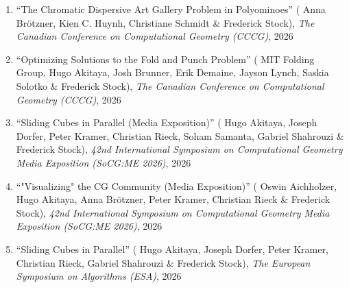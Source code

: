 \documentclass[letterpaper,11pt]{article}
\makeatletter
\newcommand{\publication}[6]{
  \item ``#1'' %
   (\ignorespaces#2), %
     \emph{#3}, %
      #4%


}
\newcommand{\pdficon}{\faFilePdf}
\newcommand{\doilabel}{\texttt{DOI}}
\makeatother
\begin{document}
    \begin{enumerate}
    \setcounter{enumi}{\value{pubnum}}
      
        \publication
          {The Chromatic Dispersive Art Gallery Problem in Polyominoes}
          {
 Anna Brötzner, Kien C. Huynh, Christiane Schmidt \& Frederick Stock}
          {The Canadian Conference on Computational Geometry (CCCG)}
          {2026}
          {%
%
%
%
          }
          {1}
 \vspace{-.5em}  
      
        \publication
          {Optimizing Solutions to the Fold and Punch Problem}
          {
 MIT Folding Group, Hugo Akitaya, Josh Brunner, Erik Demaine, Jayson Lynch, Saskia Solotko \& Frederick Stock}
          {The Canadian Conference on Computational Geometry (CCCG)}
          {2026}
          {%
%
%
%
          }
          {2}
 \vspace{-.5em}  
      
        \publication
          {Sliding Cubes in Parallel (Media Exposition)}
          {
 Hugo Akitaya, Joseph Dorfer, Peter Kramer, Christian Rieck, Soham Samanta, Gabriel Shahrouzi \& Frederick Stock}
          {42nd International Symposium on Computational Geometry Media Exposition (SoCG:ME 2026)}
          {2026}
          {%
\href{https://drops.dagstuhl.de/storage/00lipics/lipics-vol367-socg2026/LIPIcs.SoCG.2026.96/LIPIcs.SoCG.2026.96.pdf}{\pdficon}%
%
\quad\href{https://doi.org/10.4230/LIPIcs.SoCG.2026.96}{\doilabel}%
          }
          {3}
 \vspace{-.5em}  
      
        \publication
          {"Visualizing" the CG Community (Media Exposition)}
          {
 Oswin Aichholzer, Hugo Akitaya, Anna Brötzner, Peter Kramer, Christian Rieck \& Frederick Stock}
          {42nd International Symposium on Computational Geometry Media Exposition (SoCG:ME 2026)}
          {2026}
          {%
\href{https://drops.dagstuhl.de/storage/00lipics/lipics-vol367-socg2026/LIPIcs.SoCG.2026.97/LIPIcs.SoCG.2026.97.pdf}{\pdficon}%
%
\quad\href{https://doi.org/10.4230/LIPIcs.SoCG.2026.97}{\doilabel}%
          }
          {4}
 \vspace{-.5em}  
      
        \publication
          {Sliding Cubes in Parallel}
          {
 Hugo Akitaya, Joseph Dorfer, Peter Kramer, Christian Rieck, Gabriel Shahrouzi \& Frederick Stock}
          {The European Symposium on Algorithms (ESA)}
          {2026}
          {%
\href{https://drops.dagstuhl.de/storage/00lipics/lipics-vol388-esa2026/LIPIcs.ESA.2026.26/LIPIcs.ESA.2026.26.pdf}{\pdficon}%
%
\quad\href{https://doi.org/10.4230/LIPIcs.ESA.2026.26}{\doilabel}%
          }
          {5}
 \vspace{-.5em}  
      

\end{enumerate}
\end{document}
